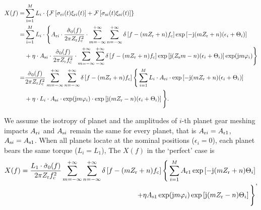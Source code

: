 \documentclass[a4paper,fleqn]{cas-sc}%
\begin{document}
\begin{equation}
    \begin{split}
        X(f) =& \sum_{\rm i=1}^{M} L_i \cdot \left\{\mathcal{F}\left[ \sigma_{{\rm r}i}(t) \xi_{{\rm r}i}(t) \right] + \mathcal{F}\left[\sigma_{{\rm s}i}(t) \xi_{{\rm s}i}(t)\right] \right\}\\
        =&\sum_{\rm i=1}^{M} L_i \cdot \Bigg\{ A_{{\rm r}i} \cdot \frac{\hat{\sigma}_0(f)}{2 \pi Z_{\rm r} f_{\rm c}^{2}} \cdot  \sum_{m=-\infty}^{+\infty} \sum_{n=-\infty}^{+\infty} \delta\left[f-(mZ_{\rm r}+n)f_{\rm c}\right] \exp\left[-{\rm j}(m Z_{\rm r}+n)(\epsilon_i+\Theta_i)\right] 
        \\
        &+\eta \cdot A_{{\rm s}i} \cdot \frac{\hat{\sigma}_0(f)}{2 \pi  Z_{\rm r} f_{\rm c}^2} \cdot \sum_{m=-\infty}^{+\infty} \sum_{-\infty}^{+\infty} \delta\left[f-(m Z_{\rm r}+ n)f_{\rm c} \right] \exp\left[ {\rm j} (Z_{\rm s} m - n)(\epsilon_i+\Theta_i) \right] \exp({\rm j}m\varphi_i) \Bigg\}\\
        =&\frac{\hat{\sigma}_0(f)}{2\pi Z_{\rm r} f_{\rm c}^{2}} \sum_{m=-\infty}^{+\infty} \sum_{n=-\infty}^{+\infty} \delta\left[f-(m Z_{\rm r}+n) f_{\rm c} \right] \Bigg\{ \sum_{i=1}^{M} L_i \cdot A_{{\rm r}i} \cdot \exp\left[ -{\rm j}(m Z_{\rm r}+n)(\epsilon_i+\Theta_i)\right]\\
        &+\eta \cdot L_i \cdot A_{{\rm s}i} \cdot \exp({\rm j}m\varphi_i) \cdot\exp\left[{\rm j}(m Z_{\rm r}-n)(\epsilon_i+\Theta_i) \right] \Bigg\}.
    \end{split}
\end{equation}
\par We assume the isotropy of planet and the amplitudes of $i$-th planet gear meshing impacts $A_{{\rm r}i}$ and $A_{{\rm s}i}$ remain the same for every planet, that is $A_{{\rm r}i}=A_{{\rm r}1}$, $A_{{\rm s}i}=A_{{\rm s}1} $. When all planets locate at the nominal positions ($\epsilon_i=0$), each planet bears the same torque ($L_i=L_1$), The $X(f)$ in the ‘perfect’ case is
\begin{equation}
    \begin{align}
        X(f)=\frac{L_1 \cdot \hat{\sigma}_0(f)}{2\pi Z_{\rm r} f_{\rm c}^{2}} \sum_{m=-\infty}^{+\infty} \sum_{n=-\infty}^{+\infty} \delta\left[f-(m Z_{\rm r}+n) f_{\rm c} \right] 
              \Bigg\{ \sum_{i=1}^{M}  A_{{\rm r}1}  \exp\left[ -{\rm j}(m Z_{\rm r}+n)\Theta_i\right]\\
              +\eta A_{{\rm s}1}\exp({\rm j}m\varphi_i) \exp\left[{\rm j}(m Z_{\rm r}-n)\Theta_i \right]\Bigg\}
    \end{align},%
\end{equation}
\end{document}
